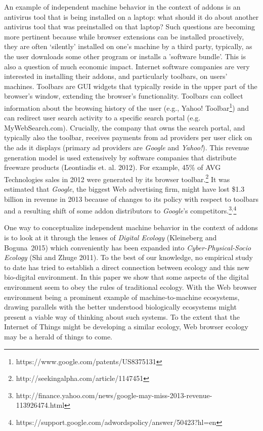 \documentclass{article} %
\begin{document}
An example of independent machine behavior in the context of addons is an antivirus tool that is being installed on a laptop: what should it do about another antivirus tool that was preinstalled on that laptop? Such questions are becoming more pertinent because while browser extensions can be installed proactively, they are often `silently' installed on one's machine by a third party, typically, as the user downloads some other program or installs a 'software bundle'. This is also a question of much economic impact. Internet software companies are very interested in installing their addons, and particularly toolbars, on users' machines. Toolbars are GUI widgets that typically reside in the upper part of the browser's window, extending the browser's functionality. Toolbars can collect information about the browsing history of the user (e.g., Yahoo! Toolbar\footnote{ https://www.google.com/patents/US8375131}) and can redirect user search activity to a specific search portal (e.g. MyWebSearch.com). Crucially, the company that owns the search portal, and typically also the toolbar, receives payments from ad providers per user click on the ads it displays (primary ad providers are \textit{Google} and \textit{Yahoo!}). This revenue generation model is used extensively by software companies that distribute freeware products (Leontiadis et. al. 2012). For example, 45\% of AVG Technologies sales in 2012 were generated by its browser toolbar.\footnote{ http://seekingalpha.com/article/1147451} It was estimated that \textit{Google}, the biggest Web advertising firm, might have lost \$1.3 billion in revenue in 2013 because of changes to its policy with respect to toolbars and a resulting shift of some addon distributors to \textit{Google}'s competitors.\footnote{ http://finance.yahoo.com/news/google-may-miss-2013-revenue-113926474.html}${}^{,}$\footnote{ https://support.google.com/adwordspolicy/answer/50423?hl=en}

One way to conceptualize independent machine behavior in the context of addons is to look at it through the lenses of \textit{Digital Ecology} (Kleineberg and Boguna~2015) which conveniently has been expanded into \textit{Cyber-Physical-Socio Ecology} (Shi and Zhuge 2011). To the best of our knowledge, no empirical study to date has tried to establish a direct connection between ecology and this new bio-digital environment. In this paper we show that some aspects of the digital environment seem to obey the rules of traditional ecology. With the Web browser environment being a prominent example of machine-to-machine ecosystems, drawing parallels with the better understood biologically ecosystems might present a viable way of thinking about such systems. To the extent that the Internet of Things might be developing a similar ecology, Web browser ecology may be a herald of things to come.  
\end{document}
